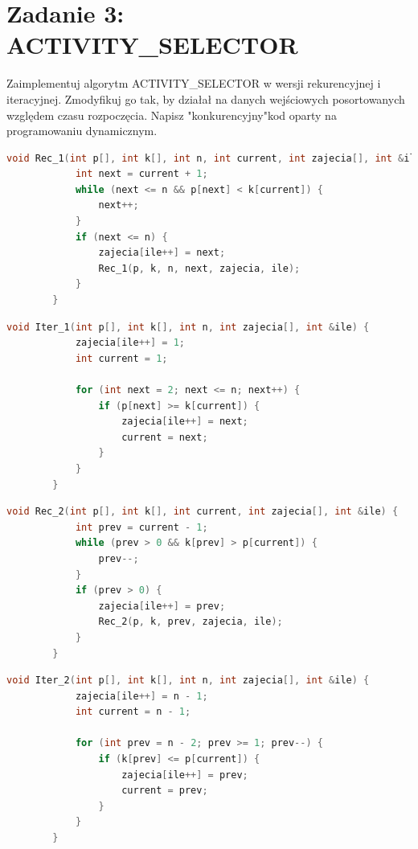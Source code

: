 \documentclass{article}
\theoremstyle{definition}
\begin{document}
	\section{Zadanie 3: ACTIVITY\_SELECTOR}
	Zaimplementuj algorytm ACTIVITY\_SELECTOR w wersji rekurencyjnej i iteracyjnej. Zmodyfikuj go tak, by działał na danych wejściowych posortowanych względem czasu rozpoczęcia. Napisz "konkurencyjny"kod oparty na programowaniu dynamicznym.
	\begin{lstlisting}[language=C++, tabsize=3, caption={Implementacja rekurencji bez modyfikacji}]
		void Rec_1(int p[], int k[], int n, int current, int zajecia[], int &ile) {
			int next = current + 1;
			while (next <= n && p[next] < k[current]) {
				next++;
			}
			if (next <= n) {
				zajecia[ile++] = next;
				Rec_1(p, k, n, next, zajecia, ile);
			}
		}
	\end{lstlisting}
	\begin{lstlisting}[language=C++, tabsize=3, caption={Implementacja iteracji bez modyfikacji}]
		void Iter_1(int p[], int k[], int n, int zajecia[], int &ile) {
			zajecia[ile++] = 1;
			int current = 1;
			
			for (int next = 2; next <= n; next++) {
				if (p[next] >= k[current]) {
					zajecia[ile++] = next;
					current = next;
				}
			}
		}
	\end{lstlisting}
	\begin{lstlisting}[language=C++, tabsize=3, caption={Implementacja rekurencji z modyfikacją}]
		void Rec_2(int p[], int k[], int current, int zajecia[], int &ile) {
			int prev = current - 1;
			while (prev > 0 && k[prev] > p[current]) {
				prev--;
			}
			if (prev > 0) {
				zajecia[ile++] = prev;
				Rec_2(p, k, prev, zajecia, ile);
			}
		}
	\end{lstlisting}
	\begin{lstlisting}[language=C++, tabsize=3, caption={Implementacja iteracji z modyfikacją}]
		void Iter_2(int p[], int k[], int n, int zajecia[], int &ile) {
			zajecia[ile++] = n - 1;
			int current = n - 1;
			
			for (int prev = n - 2; prev >= 1; prev--) {
				if (k[prev] <= p[current]) {
					zajecia[ile++] = prev;
					current = prev;
				}
			}
		}
	\end{lstlisting}
\end{document}
